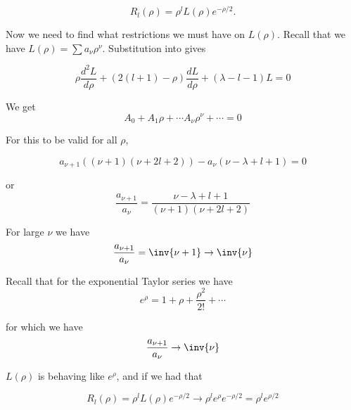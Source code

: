 \begin{equation}\label{eqn:PHY356FLecture10:170}
R_l(\rho) = \rho^l L(\rho) e^{-\rho/2}.
\end{equation}

Now we need to find what restrictions we must have on $L(\rho)$.  Recall that we have $L(\rho) = \sum a_\nu \rho^\nu$.  Substitution into  gives

\begin{equation}\label{eqn:PHY356FLecture10:180}
\rho \frac{d^2 L}{d\rho} + \left( 2(l+1) - \rho \right) \frac{d L}{d \rho} + (\lambda - l - 1) L = 0
\end{equation}

We get
\begin{equation}\label{eqn:PHY356FLecture10:190}
A_0 + A_1 \rho + \cdots A_\nu \rho^\nu + \cdots = 0
\end{equation}

For this to be valid for all $\rho$,

\begin{equation}\label{eqn:PHY356FLecture10:200}
a_{\nu+1} \left(
(\nu+1)(\nu+ 2l + 2)
\right)
-
a_{\nu} \left(
\nu - \lambda + l + 1
\right)
=0
\end{equation}

or
\begin{equation}\label{eqn:PHY356FLecture10:210}
\frac{a_{\nu+1}}{ a_{\nu} }
=
\frac{ \nu - \lambda + l + 1 }{ (\nu+1)(\nu+ 2l + 2) }
\end{equation}

For large $\nu$ we have
\begin{equation}\label{eqn:PHY356FLecture10:220}
\frac{a_{\nu+1}}{ a_{\nu} }
=
\inv{\nu+1}
\rightarrow \inv{\nu}
\end{equation}

Recall that for the exponential Taylor series we have
\begin{equation}\label{eqn:PHY356FLecture10:230}
e^\rho = 1 + \rho + \frac{\rho^2}{2!} + \cdots
\end{equation}

for which we have
\begin{equation}\label{eqn:PHY356FLecture10:240}
\frac{a_{\nu+1}}{a_\nu} \rightarrow \inv{\nu}
\end{equation}

$L(\rho)$ is behaving like $e^\rho$, and if we had that

\begin{equation}\label{eqn:PHY356FLecture10:250}
R_l(\rho) = \rho^l L(\rho) e^{-\rho/2} \rightarrow \rho^l e^\rho e^{-\rho/2} = \rho^l e^{\rho/2}
\end{equation}

